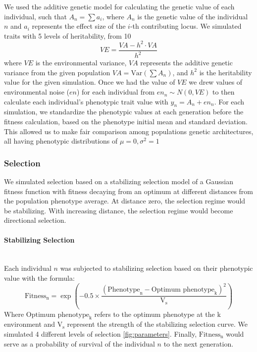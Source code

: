 \documentclass{article}
\let\oldparagraph\paragraph
\renewcommand{\paragraph}[1]{\oldparagraph{#1}\mbox{}\\}
\begin{document}
We used the additive genetic model for calculating the genetic value of each individual, such that $A_n=\sum a_i$, where $A_n$ is the genetic value of the individual $n$ and \( a_i \) represents the effect size of the \( i \)-th contributing locus. We simulated traits with 5 levels of heritability, from 10%
\[
VE = \frac{VA - h^2 \cdot VA}{h^2}
\]
where \( VE \) is the environmental variance, \( VA \) represents the additive genetic variance from the given population \( VA = \text{Var}\left(\sum A_n\right) \), and \( h^2 \) is the heritability value for the given simulation. Once we had the value of \( VE \) we drew values of environmental noise (\( en \)) for each individual from \( en_n \sim N(0, VE) \) to then calculate each individual's phenotypic trait value with \( y_n = A_n+ en_n \). For each simulation, we standardize the phenotypic values at each generation before the fitness calculation, based on the phenotype initial mean and standard deviation. This allowed us to make fair comparison among populations genetic architectures, all having phenotypic distributions of $\mu = 0, \sigma^2 = 1$

\subsubsection{Selection}
We simulated selection based on a stabilizing selection model of a Gaussian fitness function with fitness decaying from an optimum at different distances from the population phenotype average. At distance zero, the selection regime would be stabilizing. With increasing distance, the selection regime would become directional selection. 

\paragraph{Stabilizing Selection}
Each individual $n$ was subjected to stabilizing selection based on their phenotypic value with the formula:
\[
\text{Fitness}_\text{n} = \exp\left(-0.5 \times \frac{(\text{Phenotype}_\text{n} - {\text{Optimum phenotype}_\text{k}})^2}{\text{V}_\text{s}}\right)
\]
Where $\text{Optimum phenotype}_\text{k}$ refers to the optimum phenotype at the k environment and $\text{V}_\text{s}$ represent the strength of the stabilizing selection curve. We simulated 4 different levels of selection \ref{fig:parameters}. Finally,  $\text{Fitness}_\text{n}$ would serve as a probability of survival of the individual $n$ to the next generation.
\end{document}
